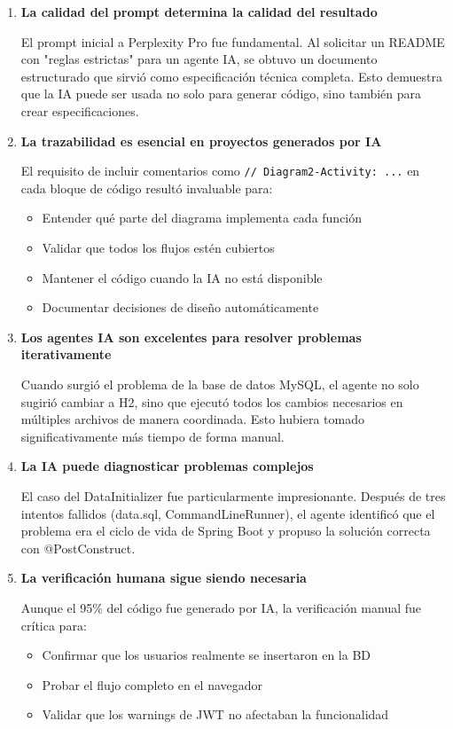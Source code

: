 \documentclass[11pt,a4paper]{article}
\begin{document}
\begin{enumerate}
    \item \textbf{La calidad del prompt determina la calidad del resultado}
    
    El prompt inicial a Perplexity Pro fue fundamental. Al solicitar un README con "reglas estrictas" para un agente IA, se obtuvo un documento estructurado que sirvió como especificación técnica completa. Esto demuestra que la IA puede ser usada no solo para generar código, sino también para crear especificaciones.
    
    \item \textbf{La trazabilidad es esencial en proyectos generados por IA}
    
    El requisito de incluir comentarios como \texttt{// Diagram2-Activity: ...} en cada bloque de código resultó invaluable para:
    \begin{itemize}
        \item Entender qué parte del diagrama implementa cada función
        \item Validar que todos los flujos estén cubiertos
        \item Mantener el código cuando la IA no está disponible
        \item Documentar decisiones de diseño automáticamente
    \end{itemize}
    
    \item \textbf{Los agentes IA son excelentes para resolver problemas iterativamente}
    
    Cuando surgió el problema de la base de datos MySQL, el agente no solo sugirió cambiar a H2, sino que ejecutó todos los cambios necesarios en múltiples archivos de manera coordinada. Esto hubiera tomado significativamente más tiempo de forma manual.
    
    \item \textbf{La IA puede diagnosticar problemas complejos}
    
    El caso del DataInitializer fue particularmente impresionante. Después de tres intentos fallidos (data.sql, CommandLineRunner), el agente identificó que el problema era el ciclo de vida de Spring Boot y propuso la solución correcta con @PostConstruct.
    
    \item \textbf{La verificación humana sigue siendo necesaria}
    
    Aunque el 95\% del código fue generado por IA, la verificación manual fue crítica para:
    \begin{itemize}
        \item Confirmar que los usuarios realmente se insertaron en la BD
        \item Probar el flujo completo en el navegador
        \item Validar que los warnings de JWT no afectaban la funcionalidad
    \end{itemize}
\end{enumerate}
\end{document}
